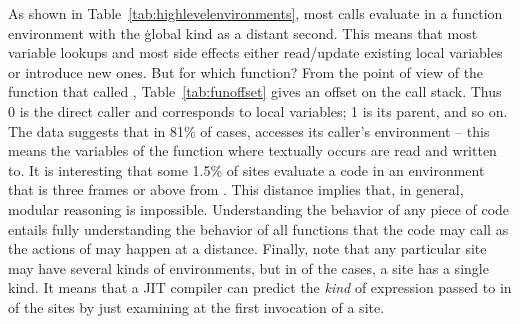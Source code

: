 \documentclass[review,screen,acmsmall,anonymous=true]{acmart}
\begin{document}
\noindent
As shown in Table~\ref{tab:highlevelenvironments}, most calls evaluate in a
function environment with the \c{global} kind as a distant second. This means
that most variable lookups and most side effects either read/update existing
local variables or introduce new ones. But for which function? From the point of
view of the function that called \eval, Table~\ref{tab:funoffset} gives an
offset on the call stack. Thus 0 is the direct caller and corresponds to local variables; 1 is its parent, and so on. The data suggests that in 81\% of cases, \eval accesses its caller's environment -- this means  the variables of the function where \eval textually
occurs are read and written to. It is interesting that some 1.5\% of sites
evaluate a code in an environment that is three frames or above from \eval. This
distance implies that, in general, modular reasoning is impossible. Understanding the behavior of any piece of code entails fully understanding the
behavior of all functions that the code may call as the actions of \eval may
happen at a distance. Finally, note that any particular site may have several
kinds of environments, but in \packageNbOneCategoryEnvirSitePercent of the cases,  a site has a single kind. It means that a JIT compiler can predict the \emph{kind} of  expression passed to \eval in \packageNbOneCategoryEnvirSitePercent of the sites by just examining at the first invocation of a site.
\end{document}
